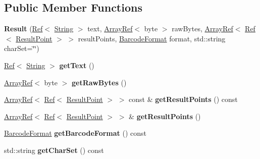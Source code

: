 \subsection*{Public Member Functions}
\begin{DoxyCompactItemize}
\item 
\mbox{\label{classzxing_1_1_result_a2bfc7cc8d79abae88596dbc1b69fdc54}} 
{\bfseries Result} (\mbox{\hyperlink{classzxing_1_1_ref}{Ref}}$<$ \mbox{\hyperlink{classzxing_1_1_string}{String}} $>$ text, \mbox{\hyperlink{classzxing_1_1_array_ref}{Array\+Ref}}$<$ byte $>$ raw\+Bytes, \mbox{\hyperlink{classzxing_1_1_array_ref}{Array\+Ref}}$<$ \mbox{\hyperlink{classzxing_1_1_ref}{Ref}}$<$ \mbox{\hyperlink{classzxing_1_1_result_point}{Result\+Point}} $>$ $>$ result\+Points, \mbox{\hyperlink{classzxing_1_1_barcode_format}{Barcode\+Format}} format, std\+::string char\+Set=\char`\"{}\char`\"{})
\item 
\mbox{\label{classzxing_1_1_result_af95fc0aa5ef50b4fc357dcaec1418292}} 
\mbox{\hyperlink{classzxing_1_1_ref}{Ref}}$<$ \mbox{\hyperlink{classzxing_1_1_string}{String}} $>$ {\bfseries get\+Text} ()
\item 
\mbox{\label{classzxing_1_1_result_abef5fbfbb9ec12dd42efb900e179c87d}} 
\mbox{\hyperlink{classzxing_1_1_array_ref}{Array\+Ref}}$<$ byte $>$ {\bfseries get\+Raw\+Bytes} ()
\item 
\mbox{\label{classzxing_1_1_result_a2a3af874e38fad1c67cb7178f2cce596}} 
\mbox{\hyperlink{classzxing_1_1_array_ref}{Array\+Ref}}$<$ \mbox{\hyperlink{classzxing_1_1_ref}{Ref}}$<$ \mbox{\hyperlink{classzxing_1_1_result_point}{Result\+Point}} $>$ $>$ const  \& {\bfseries get\+Result\+Points} () const
\item 
\mbox{\label{classzxing_1_1_result_a16156e422adeab4ff5f97993a6a61f18}} 
\mbox{\hyperlink{classzxing_1_1_array_ref}{Array\+Ref}}$<$ \mbox{\hyperlink{classzxing_1_1_ref}{Ref}}$<$ \mbox{\hyperlink{classzxing_1_1_result_point}{Result\+Point}} $>$ $>$ \& {\bfseries get\+Result\+Points} ()
\item 
\mbox{\label{classzxing_1_1_result_ab537804aeb785b3c2e9a95bafb926b64}} 
\mbox{\hyperlink{classzxing_1_1_barcode_format}{Barcode\+Format}} {\bfseries get\+Barcode\+Format} () const
\item 
\mbox{\label{classzxing_1_1_result_ac01cf9644a9ee8ffc96575062db04531}} 
std\+::string {\bfseries get\+Char\+Set} () const
\end{DoxyCompactItemize}

